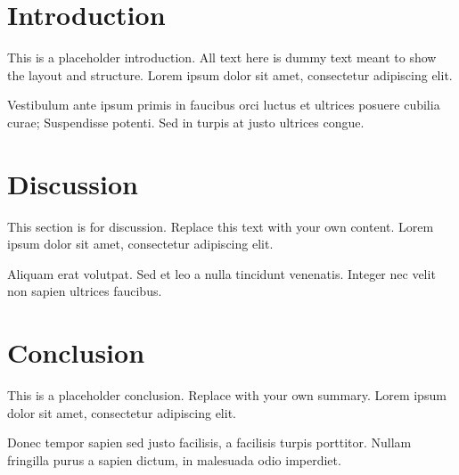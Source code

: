 \documentclass{article}
\begin{document}
\section*{Introduction}

This is a placeholder introduction. All text here is dummy text meant to show the layout and structure. Lorem ipsum dolor sit amet, consectetur adipiscing elit.  

Vestibulum ante ipsum primis in faucibus orci luctus et ultrices posuere cubilia curae; Suspendisse potenti. Sed in turpis at justo ultrices congue.

\section*{Discussion}

This section is for discussion. Replace this text with your own content. Lorem ipsum dolor sit amet, consectetur adipiscing elit.  

Aliquam erat volutpat. Sed et leo a nulla tincidunt venenatis. Integer nec velit non sapien ultrices faucibus.

\section*{Conclusion}

This is a placeholder conclusion. Replace with your own summary. Lorem ipsum dolor sit amet, consectetur adipiscing elit.  

Donec tempor sapien sed justo facilisis, a facilisis turpis porttitor. Nullam fringilla purus a sapien dictum, in malesuada odio imperdiet.
\end{document}

